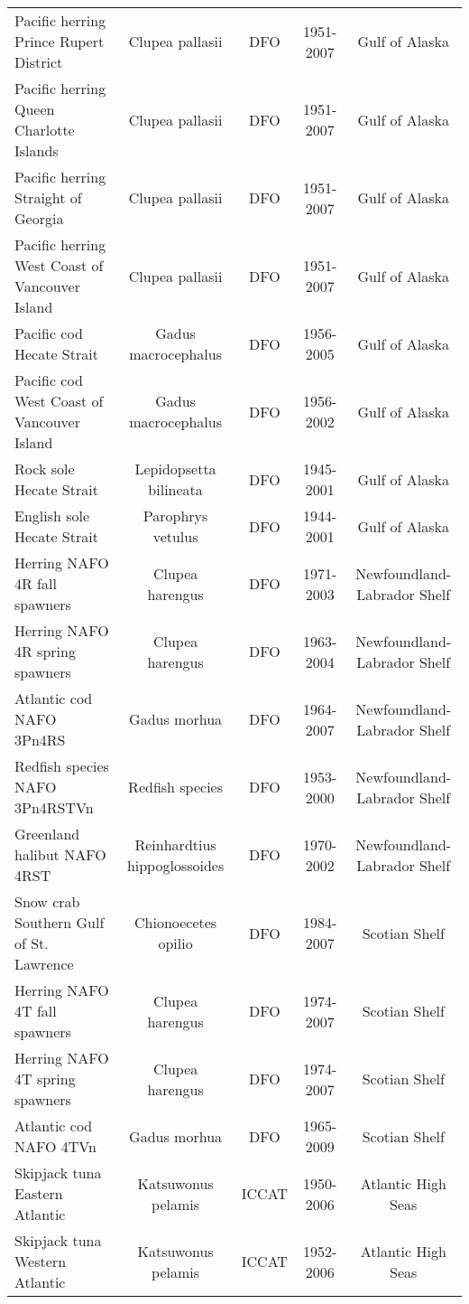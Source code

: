 \begin{longtable}{p{3cm}cccc}
  Pacific herring Prince Rupert District & Clupea pallasii & DFO & 1951-2007 & Gulf of Alaska \\ 
  Pacific herring Queen Charlotte Islands & Clupea pallasii & DFO & 1951-2007 & Gulf of Alaska \\ 
  Pacific herring Straight of Georgia & Clupea pallasii & DFO & 1951-2007 & Gulf of Alaska \\ 
  Pacific herring West Coast of Vancouver Island & Clupea pallasii & DFO & 1951-2007 & Gulf of Alaska \\ 
  Pacific cod Hecate Strait & Gadus macrocephalus & DFO & 1956-2005 & Gulf of Alaska \\ 
  Pacific cod West Coast of Vancouver Island & Gadus macrocephalus & DFO & 1956-2002 & Gulf of Alaska \\ 
  Rock sole Hecate Strait & Lepidopsetta bilineata & DFO & 1945-2001 & Gulf of Alaska \\ 
  English sole Hecate Strait & Parophrys vetulus & DFO & 1944-2001 & Gulf of Alaska \\ 
  Herring NAFO 4R fall spawners & Clupea harengus & DFO & 1971-2003 & Newfoundland-Labrador Shelf \\ 
  Herring NAFO 4R spring spawners & Clupea harengus & DFO & 1963-2004 & Newfoundland-Labrador Shelf \\ 
  Atlantic cod NAFO 3Pn4RS & Gadus morhua & DFO & 1964-2007 & Newfoundland-Labrador Shelf \\ 
  Redfish species NAFO 3Pn4RSTVn & Redfish species & DFO & 1953-2000 & Newfoundland-Labrador Shelf \\ 
  Greenland halibut NAFO 4RST & Reinhardtius hippoglossoides & DFO & 1970-2002 & Newfoundland-Labrador Shelf \\ 
  Snow crab Southern Gulf of St. Lawrence & Chionoecetes opilio & DFO & 1984-2007 & Scotian Shelf \\ 
  Herring NAFO 4T fall spawners & Clupea harengus & DFO & 1974-2007 & Scotian Shelf \\ 
  Herring NAFO 4T spring spawners & Clupea harengus & DFO & 1974-2007 & Scotian Shelf \\ 
  Atlantic cod NAFO 4TVn & Gadus morhua & DFO & 1965-2009 & Scotian Shelf \\ 
  Skipjack tuna Eastern Atlantic & Katsuwonus pelamis & ICCAT & 1950-2006 & Atlantic High Seas \\ 
  Skipjack tuna Western Atlantic & Katsuwonus pelamis & ICCAT & 1952-2006 & Atlantic High Seas \\ 

\end{longtable}
